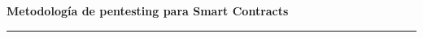 \documentclass[11pt,a4paper,twoside]{report}
\begin{document}
\singlespacing
\RaggedRight

\begin{titlepage}
\begin{center}


\vspace{5cm}

\parbox{0.8\textwidth}{
    \centering
    \Large\textbf{Metodología de pentesting para Smart Contracts} \\
}

\vspace{8cm} %

\end{center}



\vspace{2mm} %

\noindent %
{\color{lightgray}\rule{\linewidth}{4pt}} %


\end{titlepage}

\pagestyle{fancy} %
\fancyhf{} %
\renewcommand{\headrulewidth}{0pt} %
\renewcommand{\footrulewidth}{0pt} %




\tableofcontents
\clearpage

% 
% 
% 
% 
% 
% 

\appendix

\end{document}
